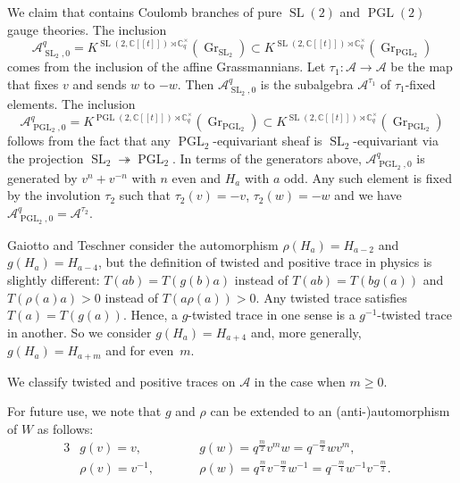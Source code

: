 \documentclass[pdftex]{sigma}
\newcommand\CC{\mathbb{C}}
\DeclareMathOperator\SL{SL}
\newcommand{\mc}{\mathcal}
\newcommand{\Gr}{\operatorname{Gr}}
\newcommand{\PGL}{\operatorname{PGL}}
\numberwithin{equation}{section}
\theoremstyle{definition}
\begin{document}
We claim that \smash{$K^{\SL(2,\CC[[t]])\rtimes \CC_q^{\times}}(\Gr_{\PGL_2})$} contains Coulomb branches of pure $\SL(2)$ and $\PGL(2)$ gauge theories. The inclusion \[\mc{A}_{\SL_2,0}^q=K^{\SL(2,\CC[[t]])\rtimes \CC_q^{\times}}(\Gr_{\SL_2})\subset K^{\SL(2,\CC[[t]])\rtimes \CC_q^{\times}}(\Gr_{\PGL_2})\] comes from the inclusion of the affine Grassmannians. Let $\tau_1\colon \mc{A}\to\mc{A}$ be the map that fixes $v$ and sends $w$ to $-w$. Then $\mc{A}_{\SL_2,0}^q$ is the subalgebra $\mc{A}^{\tau_1}$ of $\tau_1$-fixed elements. The inclusion \[\mc{A}_{\PGL_2,0}^q=K^{\PGL(2,\CC[[t]])\rtimes \CC_q^{\times}}(\Gr_{\PGL_2})\subset K^{\SL(2,\CC[[t]])\rtimes \CC_q^{\times}}(\Gr_{\PGL_2})\] follows from the fact that any $\PGL_2$-equivariant sheaf is $\SL_2$-equivariant via the projection $\SL_2\twoheadrightarrow \PGL_2$. In terms of the generators above, $\mc{A}_{\PGL_2,0}^q$ is generated by $v^n+v^{-n}$ with $n$ even and $H_a$ with $a$ odd. Any such element is fixed by the involution $\tau_2$ such that $\tau_2(v)=-v$, $\tau_2(w)=-w$ and we have $\mc{A}^{q}_{\PGL_2,0}=\mc{A}^{\tau_2}$.

Gaiotto and Teschner consider the automorphism $\rho(H_a)=H_{a-2}$ and $g(H_a)=H_{a-4}$, but the definition of twisted and positive trace in physics is slightly different: $T(ab)=T(g(b)a)$ instead of $T(ab)=T(bg(a))$ and $T(\rho(a)a)>0$ instead of $T(a\rho(a))>0$. Any twisted trace satisfies~${T(a)=T(g(a))}$. Hence, a $g$-twisted trace in one sense is a $g^{-1}$-twisted trace in another. So we consider $g(H_a)=H_{a+4}$ and, more generally, $g(H_a)=H_{a+m}$ and  for even~$m$.

We classify twisted and positive traces on $\mc{A}$ in the case when $m\geq 0$.

For future use, we note that $g$ and $\rho$ can be extended to an (anti-)automorphism of $W$ as follows:
 \begin{alignat*}{3}
 & g(v)=v,\qquad&& g(w)=q^{\frac{m}{2}}v^mw=q^{-\frac{m}{2}}wv^{m},&\\
 & \rho(v)=v^{-1},\qquad && \rho(w)=q^{\frac{m}{4}}v^{-\frac{m}{2}}w^{-1}=q^{-\frac{m}{4}} w^{-1}v^{-\frac{m}{2}}.&
\end{alignat*}
\end{document}
